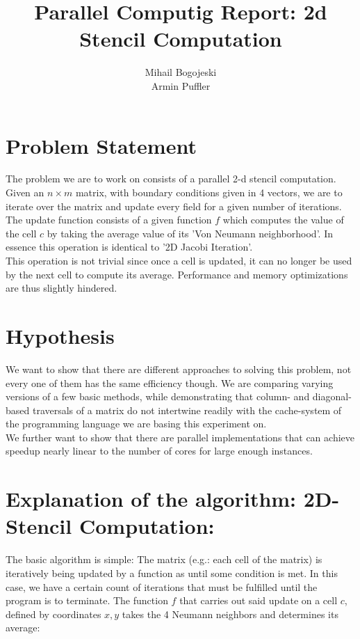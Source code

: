 \documentclass[11pt]{article}
\title{\textbf{Parallel Computig Report: 2d Stencil Computation}}
\author{Mihail Bogojeski\\
		Armin Puffler}
\date{}
\begin{document}
\maketitle

\section{Problem Statement}

The problem we are to work on consists of a parallel 2-d stencil computation.\\
Given an $n \times m$ matrix, with boundary conditions given in 4 vectors, we are to iterate over the matrix and update every field for a given number of iterations.\\ 
The update function consists of a given function $f$ which computes the value of the cell $c$ by taking the average value of its 'Von Neumann neighborhood'. In essence this operation is identical to '2D Jacobi Iteration'.\\
This operation is not trivial since once a cell is updated, it can no longer be used by the next cell to compute its average. Performance and memory optimizations are thus slightly hindered.\\
 
\section{Hypothesis}

We want to show that there are different approaches to solving this problem, not every one of them has the same efficiency though. We are comparing varying versions of a few basic methods, while demonstrating that column- and diagonal-based traversals of a matrix do not intertwine readily with the cache-system of the programming language we are basing this experiment on.\\
We further want to show that there are parallel implementations that can achieve speedup nearly linear to the number of cores for large enough instances.

\section{Explanation of the algorithm: 2D-Stencil Computation: }

The basic algorithm is simple: The matrix (e.g.: each cell of the matrix) is iteratively being updated by a function as until some condition is met. In this case, we have a certain count of iterations that must be fulfilled until the program is to terminate.
The function $f$ that carries out said update on a cell $c$, defined by coordinates $x, y$ takes the 4 Neumann neighbors and determines its average:
\end{document}
